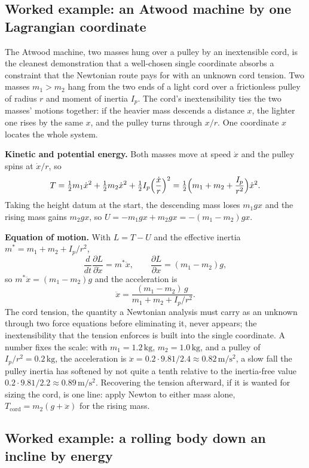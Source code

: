 \subsection{Worked example: an Atwood machine by one Lagrangian coordinate}

The Atwood machine, two masses hung over a pulley by an inextensible cord,
is the cleanest demonstration that a well-chosen single coordinate absorbs a
constraint that the Newtonian route pays for with an unknown cord tension. Two
masses $m_1 > m_2$ hang from the two ends of a light cord over a frictionless
pulley of radius $r$ and moment of inertia $I_p$. The cord's inextensibility
ties the two masses' motions together: if the heavier mass descends a distance
$x$, the lighter one rises by the same $x$, and the pulley turns through
$x/r$. One coordinate $x$ locates the whole system.

\textbf{Kinetic and potential energy.} Both masses move at speed $\dot x$ and
the pulley spins at $\dot x/r$, so
\[
T = \tfrac12 m_1\dot x^2 + \tfrac12 m_2\dot x^2
  + \tfrac12 I_p\Bigl(\frac{\dot x}{r}\Bigr)^2
= \tfrac12\Bigl(m_1 + m_2 + \frac{I_p}{r^2}\Bigr)\dot x^2.
\]
Taking the height datum at the start, the descending mass loses $m_1 g x$ and
the rising mass gains $m_2 g x$, so $U = -m_1 g x + m_2 g x = -(m_1 - m_2)gx$.

\textbf{Equation of motion.} With $L = T - U$ and the effective inertia
$m^\ast = m_1 + m_2 + I_p/r^2$,
\[
\frac{d}{dt}\frac{\partial L}{\partial\dot x}
= m^\ast\ddot x,
\qquad
\frac{\partial L}{\partial x} = (m_1 - m_2)g,
\]
so $m^\ast\ddot x = (m_1 - m_2)g$ and the acceleration is
\[
\ddot x = \frac{(m_1 - m_2)\,g}{m_1 + m_2 + I_p/r^2}.
\]
The cord tension, the quantity a Newtonian analysis must carry as an unknown
through two force equations before eliminating it, never appears; the
inextensibility that the tension enforces is built into the single coordinate.
A number fixes the scale: with $m_1 = 1.2\,\si{\kilogram}$, $m_2 = 1.0\,\si
{\kilogram}$, and a pulley of $I_p/r^2 = 0.2\,\si{\kilogram}$, the acceleration
is $\ddot x = 0.2\cdot 9.81/2.4 \approx 0.82\,\si{\meter\per\second\squared}$,
a slow fall the pulley inertia has softened by not quite a tenth relative to the
inertia-free value $0.2\cdot 9.81/2.2 \approx 0.89\,\si{\meter\per\second
\squared}$. Recovering the tension afterward, if it is wanted for sizing the
cord, is one line: apply Newton to either mass alone, $T_\text{cord} = m_2
(g + \ddot x)$ for the rising mass.

\subsection{Worked example: a rolling body down an incline by energy}

